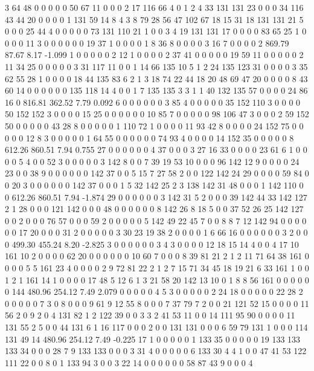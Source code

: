  3 64 48 0 0 0 0 0 50 67 11 0 0 0 2 17 116 66 4 0
 1 2 4 33 131 131 23 0 0 0 34 116 43 44 20 0 0 0 0 1
 131 59 14 8 4 3 8 79 28 56 47 102 67 18 15 31 18 131 131 21
 5 0 0 0 25 44 4 0 0 0 0 0 73 131 110 21 1 0 0 3
 4 19 131 131 17 0 0 0 0 83 65 25 1 0 0 0 0 11 3 0
 0 0 0 0 0 19 37 1 0 0 0 0 1 8 36 8 0 0 0 0
 3 16 7 0 0 0 0 2
869.79 87.67 8.17 -1.099
 1 0 0 0 0 0 2 12 1 0 0 0 0 2 37 41 0 0 0 0
 0 19 59 11 0 0 0 0 0 2 11 34 25 0 0 0 0 0 3 31
 117 11 0 0 1 14 66 135 10 5 1 2 24 135 123 31 0 0 0 0
 3 35 62 55 28 1 0 0 0 0 18 44 135 83 6 2 1 3 18 74
 22 44 18 20 48 69 47 20 0 0 0 0 8 43 60 14 0 0 0 0
 0 0 135 118 14 4 0 0 1 7 135 135 3 3 1 1 40 132 135 57
 0 0 0 0 24 86 16 0
816.81 362.52 7.79 0.092
 6 0 0 0 0 0 0 3 85 4 0 0 0 0 0 35 152 110 3 0
 0 0 0 50 152 152 3 0 0 0 0 15 25 0 0 0 0 0 0 10
 85 7 0 0 0 0 0 98 106 47 3 0 0 0 2 59 152 50 0 0
 0 0 0 43 28 8 0 0 0 0 0 1 110 72 1 0 0 0 0 11
 93 42 8 0 0 0 0 24 152 75 0 0 0 0 0 12 8 3 0 0
 0 0 0 1 64 55 0 0 0 0 0 0 74 93 4 0 0 0 0 14
 152 35 0 0 0 0 0 8
612.26 860.51 7.94 0.755
 27 0 0 0 0 0 0 4 37 0 0 0 3 27 16 33 0 0 0 0
 23 61 6 1 0 0 0 0 5 4 0 0 52 3 0 0 0 0 0 3
 142 8 0 0 7 39 19 53 10 0 0 0 96 142 12 9 0 0 0 0
 24 23 0 0 38 9 0 0 0 0 0 0 142 37 0 0 5 15 7 27
 58 2 0 0 122 142 24 29 0 0 0 0 59 84 0 0 20 3 0 0
 0 0 0 0 142 37 0 0 0 1 5 32 142 25 2 3 138 142 31 48
 0 0 0 1 142 110 0 0
612.26 860.51 7.94 -1.874
 29 0 0 0 0 0 0 3 142 31 5 2 0 0 0 39 142 44 33 142
 127 2 1 28 0 0 0 121 142 0 0 0 48 0 0 0 0 0 0 8
 142 26 8 18 5 0 0 37 52 26 25 142 127 0 0 2 0 0 0 76
 57 0 0 0 59 2 0 0 0 0 0 5 142 49 22 45 7 0 0 8
 8 7 12 142 94 0 0 0 0 0 0 17 20 0 0 0 31 2 0 0
 0 0 0 3 30 23 19 38 2 0 0 0 0 1 6 66 16 0 0 0
 0 0 0 3 2 0 0 0
499.30 455.24 8.20 -2.825
 3 0 0 0 0 0 0 3 4 3 0 0 0 0 12 18 15 14 4 0
 0 4 17 10 161 10 2 0 0 0 0 62 20 0 0 0 0 0 0 10
 60 7 0 0 0 8 39 81 21 2 1 2 11 71 64 38 161 0 0 0
 0 5 5 161 23 4 0 0 0 0 2 9 72 81 22 2 1 2 7 15
 71 34 45 18 19 21 6 33 161 1 0 0 1 2 1 161 14 1 0 0
 0 0 17 48 5 12 6 1 3 21 58 20 142 13 10 0 1 8 8 56
 161 0 0 0 0 0 0 144
480.96 254.12 7.49 2.079
 0 0 0 0 0 4 5 3 0 0 0 0 0 2 24 18 0 0 0 0
 0 22 28 2 0 0 0 0 0 7 3 0 8 0 0 0 9 61 9 12
 55 8 0 0 0 7 37 79 7 2 0 0 21 121 52 15 0 0 0 0
 11 56 2 0 9 2 0 4 131 82 1 2 122 39 0 0 3 3 2 41
 53 11 0 0 14 111 95 90 0 0 0 0 11 131 55 2 5 0 0 44
 131 6 1 16 117 0 0 0 2 0 0 131 131 0 0 0 6 59 79 131
 1 0 0 0 114 131 49 14
480.96 254.12 7.49 -0.225
 17 1 0 0 0 0 0 1 133 35 0 0 0 0 0 19 133 133 133 34
 0 0 0 28 7 9 133 133 0 0 0 3 31 4 0 0 0 0 0 6
 133 30 4 4 1 0 0 47 41 53 122 111 22 0 0 8 0 1 133 94
 3 0 0 3 22 14 0 0 0 0 0 0 58 87 43 9 0 0 0 4
